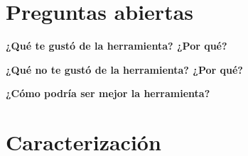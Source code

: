 \newpage

\section*{Preguntas abiertas}

\vspace*{1cm}

\textbf{¿Qué te gustó de la herramienta? ¿Por qué?}

\vspace*{3cm}

\textbf{¿Qué no te gustó de la herramienta? ¿Por qué?}

\vspace*{3cm}

\textbf{¿Cómo podría ser mejor la herramienta?}

\vspace*{3cm}

\newpage
\section*{Caracterización}

